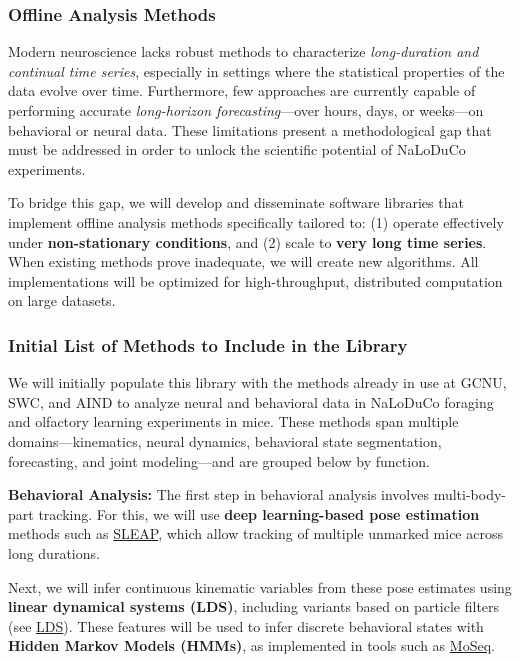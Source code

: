 
\subsubsection{Offline Analysis Methods}
\label{sec:offlineAnalysisMethods}

Modern neuroscience lacks robust methods to characterize \textit{long-duration
and continual time series}, especially in settings where the statistical
properties of the data evolve over time. Furthermore, few approaches are
currently capable of performing accurate \textit{long-horizon forecasting}—over
hours, days, or weeks—on behavioral or neural data. These limitations present a
methodological gap that must be addressed in order to unlock the scientific
potential of NaLoDuCo experiments.

To bridge this gap, we will develop and disseminate software libraries that
implement offline analysis methods specifically tailored to: (1) operate
effectively under \textbf{non-stationary conditions}, and (2) scale to
\textbf{very long time series}. When existing methods prove inadequate, we will
create new algorithms. All implementations will be optimized for
high-throughput, distributed computation on large datasets.

\subsubsection*{Initial List of Methods to Include in the Library}
\label{sec:initialListOfMethods}

We will initially populate this library with the methods already in use at
GCNU, SWC, and AIND to analyze neural and behavioral data in NaLoDuCo foraging
and olfactory learning experiments in mice. These methods span multiple
domains—kinematics, neural dynamics, behavioral state segmentation,
forecasting, and joint modeling—and are grouped below by function.

\vspace{1em}
\noindent\textbf{Behavioral Analysis:}  
The first step in behavioral analysis involves multi-body-part tracking. For
this, we will use \textbf{deep learning-based pose estimation} methods such as
\href{https://github.com/talmolab/sleap}{SLEAP}, which allow tracking of
multiple unmarked mice across long durations.

Next, we will infer continuous kinematic variables from these pose estimates
using \textbf{linear dynamical systems (LDS)}, including variants based on
particle filters (see \href{https://github.com/joacorapela/lds}{LDS}). These
features will be used to infer discrete behavioral states with \textbf{Hidden
Markov Models (HMMs)}, as implemented in tools such as
\href{https://dattalab.github.io/moseq2-website/index.html}{MoSeq}.

